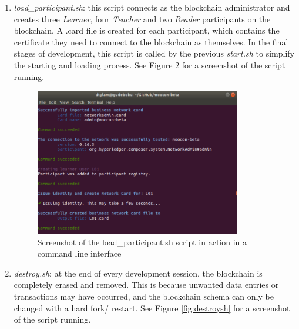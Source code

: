 \begin{enumerate}
\begin{figure}[!ht]
		      \label{fig:startsh}
	      \end{figure}
	\item \textit{load\_participant.sh}: this script connects as the blockchain administrator and creates
	      three \textit{Learner}, four \textit{Teacher} and two \textit{Reader} participants on the blockchain.
	      A .card file is created for each participant, which contains the certificate they need to
	      connect to the blockchain as themselves. In the final stages of development, this script is called by
	      the previous \textit{start.sh} to simplify the starting and loading process.
	      See Figure \ref{fig:load_participantsh} for a screenshot of the script running.
	      \begin{figure}[!ht]
		      \centering
		      \includegraphics[width=0.85\textwidth]{load_participantsh}
		      \caption[Participant Loading Script Screenshot]
		      {Screenshot of the load\_participant.sh script in action in a command line interface}
		      \label{fig:load_participantsh}
	      \end{figure}
	\item \textit{destroy.sh}: at the end of every development session, the blockchain is completely
	      erased and removed. This is because unwanted data entries or transactions may have occurred, and
	      the blockchain schema can only be changed with a hard fork/ restart.
	      See Figure \ref{fig:destroysh} for a screenshot of the script running.
	      \begin{figure}[!ht]
		      \centering

\end{figure}
\end{enumerate}
